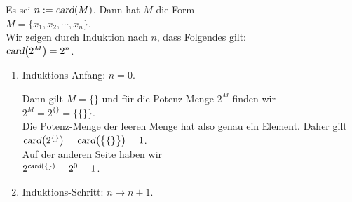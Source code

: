\proof
Es sei $n := \textsl{card}(M)$.  Dann hat $M$ die Form
\\[0.2cm]
\hspace*{1.3cm}
$M = \{ x_1, x_2, \cdots, x_n \}$.
\\[0.2cm]
Wir zeigen durch Induktion nach $n$, dass Folgendes gilt:
\\[0.2cm]
\hspace*{1.3cm}
$\textsl{card}\bigl(2^M\bigr) = 2^n$.
\begin{enumerate}
\item Induktions-Anfang: $n = 0$.

      Dann gilt  $M = \{\}$ und für die Potenz-Menge $2^M$ finden wir
      \\[0.2cm]
      \hspace*{1.3cm}
      $2^M = 2^{\{\}} = \bigl\{ \{\} \bigr\}$.
      \\[0.2cm]
      Die Potenz-Menge der leeren Menge hat also genau ein Element.  Daher gilt
      \\[0.2cm]
      \hspace*{1.3cm}
      $\textsl{card}\bigl(2^{\{\}}\bigr) = \textsl{card}\bigl(\bigl\{ \{\} \bigr\}\bigr) = 1$.
      \\[0.2cm]
      Auf der anderen Seite haben wir 
      \\[0.2cm]
      \hspace*{1.3cm}
      $2^{\textsl{card}(\{\})} = 2^0 = 1$.
\item Induktions-Schritt: $n \mapsto n + 1$.


\end{enumerate}
